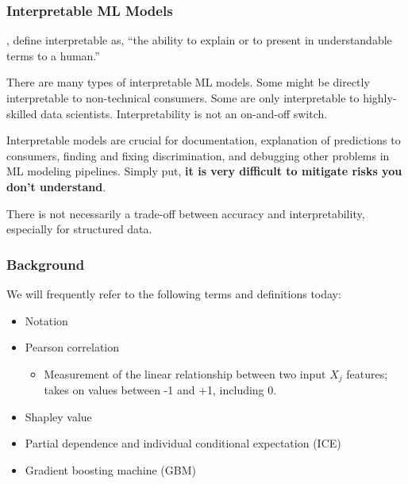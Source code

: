 \documentclass[11pt,aspectratio=169,hyperref={colorlinks}]{beamer}
\begin{document}
		\begin{frame}
	
			\frametitle{Interpretable ML Models}			
			
			\small
			
			\cite{been_kim1}, define interpretable as, ``the ability to explain or to present in understandable terms to a human.''
			
			\vspace{10pt}
			
			There are many types of interpretable ML models. Some might be directly interpretable to non-technical consumers. Some are only interpretable to highly-skilled data scientists. Interpretability is not an on-and-off switch.
			
			\vspace{10pt}
			
			Interpretable models are crucial for documentation, explanation of predictions to consumers, finding and fixing discrimination, and debugging other problems in ML modeling pipelines. Simply put, \textbf{it is very difficult to mitigate risks you don't understand}.
			
			\vspace{10pt}
			
			There is not necessarily a trade-off between accuracy and interpretability, especially for structured data.
			
			\normalsize
			
			
		\end{frame}	

		\begin{frame}
		
			\frametitle{Background}		
			
			We will frequently refer to the following terms and definitions today: \\			
			
			\begin{itemize}
				\item{Notation}
				\item{Pearson correlation}
					\begin{itemize}
						\item{Measurement of the linear relationship between two input $X_j$ features; takes on values between -1 and +1, including 0.}
					\end{itemize}
				\item{Shapley value}
				\item{Partial dependence and individual conditional expectation (ICE)}
				\item{Gradient boosting machine (GBM)}
			\end{itemize}			
		
		\end{frame}
\end{document}
